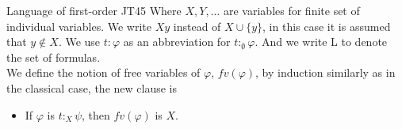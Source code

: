 \documentclass{beamer}
\theoremstyle{definition}
\newcommand{\vazio}{\emptyset}
\begin{document}
\begin{frame}{Language of first-order JT45}
\qquad Where $X, Y, \dots$ are variables for finite set of individual variables.  We write $Xy$ instead of $X \cup \{y\}$, in this case it is assumed that $y \notin X$. We use $t$$:$$\varphi$ as an abbreviation for $t$$:_{\vazio}$$\varphi$. And we write L to denote the set of formulas.\\
\vspace{5mm}
\qquad We define the notion of free variables of $\varphi$, $fv(\varphi)$, by induction similarly as in the classical case, the new clause is
\begin{itemize} 
\item If $\varphi$ is $t$$:_{X}$$\psi$, then  $fv(\varphi)$ is $X$.
\end{itemize}
 
\end{frame}	
		
		
\end{document}
